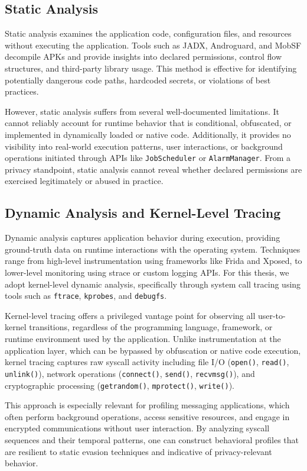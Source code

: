 \documentclass[a4paper,12pt]{report}
\begin{document}
\subsection{Static Analysis}
Static analysis examines the application code, configuration files, and resources without executing the application. Tools such as JADX, Androguard, and MobSF decompile APKs and provide insights into declared permissions, control flow structures, and third-party library usage. This method is effective for identifying potentially dangerous code paths, hardcoded secrets, or violations of best practices.

However, static analysis suffers from several well-documented limitations. It cannot reliably account for runtime behavior that is conditional, obfuscated, or implemented in dynamically loaded or native code. Additionally, it provides no visibility into real-world execution patterns, user interactions, or background operations initiated through APIs like \texttt{JobScheduler} or \texttt{AlarmManager}. From a privacy standpoint, static analysis cannot reveal whether declared permissions are exercised legitimately or abused in practice.

\subsection{Dynamic Analysis and Kernel-Level Tracing}
Dynamic analysis captures application behavior during execution, providing ground-truth data on runtime interactions with the operating system. Techniques range from high-level instrumentation using frameworks like Frida and Xposed, to lower-level monitoring using strace or custom logging APIs. For this thesis, we adopt kernel-level dynamic analysis, specifically through system call tracing using tools such as \texttt{ftrace}, \texttt{kprobes}, and \texttt{debugfs}.

Kernel-level tracing offers a privileged vantage point for observing all user-to-kernel transitions, regardless of the programming language, framework, or runtime environment used by the application. Unlike instrumentation at the application layer, which can be bypassed by obfuscation or native code execution, kernel tracing captures raw syscall activity including file I/O (\texttt{open()}, \texttt{read()}, \texttt{unlink()}), network operations (\texttt{connect()}, \texttt{send()}, \texttt{recvmsg()}), and cryptographic processing (\texttt{getrandom()}, \texttt{mprotect()}, \texttt{write()}).

This approach is especially relevant for profiling messaging applications, which often perform background operations, access sensitive resources, and engage in encrypted communications without user interaction. By analyzing syscall sequences and their temporal patterns, one can construct behavioral profiles that are resilient to static evasion techniques and indicative of privacy-relevant behavior.
\end{document}
